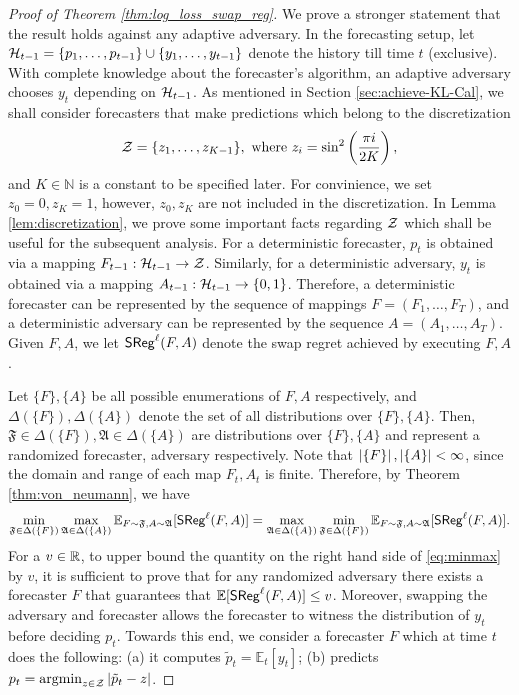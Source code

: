 \begin{proof}[Proof of Theorem \ref{thm:log_loss_swap_reg}]
We prove a stronger statement that the result holds against any adaptive adversary. In the forecasting setup, let $\mathcal{H}_{t - 1} = \{p_{1}, \dots, p_{t - 1}\} \cup \{y_{1}, \dots, y_{t - 1}\}$ denote the history till time $t$ (exclusive). With complete knowledge about the forecaster's algorithm, an adaptive adversary chooses $y_{t}$ depending on $\mathcal{H}_{t - 1}$. As mentioned in Section \ref{sec:achieve-KL-Cal}, we shall consider forecasters that make predictions which belong to the discretization 
    \begin{align*}
        \mathcal{Z} = \{z_{1}, \dots, z_{K - 1}\}, \text{ where } z_{i} = \sin ^ {2} \left( \frac{\pi i}{2K} \right),
    \end{align*}
    and $K \in \mathbb{N}$ is a constant to be specified later. For convinience, we set $z_{0} = 0, z_{K} = 1$,
    however, $z_{0}, z_{K}$ are not included in the discretization. In Lemma \ref{lem:discretization}, we prove some important facts regarding $\mathcal{Z}$ which shall be useful for the subsequent analysis. For a deterministic forecaster, $p_{t}$ is obtained via a mapping ${F}_{t - 1}: \mathcal{H}_{t - 1} \to \mathcal{Z}$. Similarly, for a deterministic adversary, $y_{t}$ is obtained via a mapping $A_{t - 1}: \mathcal{H}_{t - 1} \to \{0, 1\}$. Therefore, a deterministic forecaster can be represented by the sequence of mappings $F = (F_{1}, \dots, F_{T})$, and a deterministic adversary can be represented by the sequence $A = (A_{1}, \dots, A_{T})$. Given $F, A$, we let $\mathsf{SReg}^{\ell}({F, A})$ denote the swap regret achieved by executing $F, A$.

    Let $\{F\}, \{A\}$ be all possible enumerations of $F, A$ respectively, and $\Delta(\{F\}), \Delta(\{A\})$ denote the set of all distributions over $\{F\}, \{A\}$. Then, $\mathfrak{F} \in \Delta(\{F\}), \mathfrak{A} \in \Delta(\{A\})$ are distributions over $\{F\}, \{A\}$ and represent a randomized forecaster, adversary respectively. Note that $\left\lvert\{F\}\right\rvert, \left\lvert\{A\}\right\rvert < \infty$, since the domain and range of each map $F_{t}, A_{t}$ is finite. Therefore, by Theorem \ref{thm:von_neumann}, we have \begin{align}\label{eq:minmax}
        \min_{\mathfrak{F} \in \Delta(\{F\})} \max_{\mathfrak{A} \in \Delta(\{A\})} \mathbb{E}_{F \sim \mathfrak{F}, A \sim \mathfrak{A}}[\mathsf{SReg}^{\ell}(F, A)] = \max_{\mathfrak{A} \in \Delta(\{A\})} \min_{\mathfrak{F} \in \Delta(\{F\})}  \mathbb{E}_{F \sim \mathfrak{F}, A \sim \mathfrak{A}}[\mathsf{SReg}^{\ell}(F, A)]. 
    \end{align}
    For a $v \in {\mathbb{R}}$, to upper bound the quantity on the right hand side of \eqref{eq:minmax} by $v$, it is sufficient to prove that for any randomized adversary there exists a forecaster $F$ that guarantees that $\mathbb{E}[\mathsf{SReg}^{\ell}(F, A)] \le v$. Moreover, swapping the adversary and forecaster allows the forecaster to witness the distribution of $y_{t}$ before deciding $p_{t}$.
    Towards this end, we consider a forecaster $F$ which at time $t$ does the following: (a) it computes $\tilde{p}_{t} = \mathbb{E}_{t}[y_{t}]$; (b) predicts $p_{t} = \operatorname*{argmin}_{z \in \mathcal{Z}} \left\lvert\tilde{p}_{t} - z\right\rvert$.


\end{proof}

